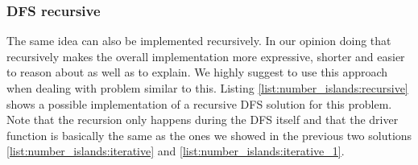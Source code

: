 


\subsubsection{DFS recursive}
The same idea can also be implemented recursively. In our opinion doing that recursively makes the overall implementation more expressive, shorter and easier to reason about as well as to explain. We highly suggest to use this approach when dealing with problem similar to this. Listing \ref{list:number_islands:recursive} shows a possible implementation of a recursive DFS solution for this problem. Note that the recursion only happens during the DFS itself and that the driver function  is basically the same as the ones we showed in the previous two solutions \ref{list:number_islands:iterative} and \ref{list:number_islands:iterative_1}.

